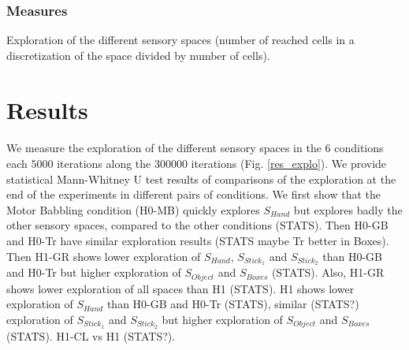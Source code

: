 \documentclass[10pt,letterpaper]{article}
\begin{document}
		
		\subsubsection{Measures}
			
			Exploration of the different sensory spaces (number of reached cells in a discretization of the space divided by number of cells).
			
		
	
%


\section{Results}
	
	\paragraph{}
	We measure the exploration of the different sensory spaces in the $6$ conditions each $5000$ iterations along the $300000$ iterations (Fig. \ref{res_explo}).
	We provide statistical Mann-Whitney U test results of comparisons of the exploration at the end of the experiments in different pairs of conditions.
	We first show that the Motor Babbling condition (H0-MB) quickly explores $S_{Hand}$ but explores badly the other sensory spaces, compared to the other conditions (STATS).
	Then H0-GB and H0-Tr have similar exploration results (STATS maybe Tr better in Boxes).
	Then H1-GR shows lower exploration of $S_{Hand}$, $S_{Stick_1}$ and $S_{Stick_2}$ than H0-GB and H0-Tr but higher exploration of $S_{Object}$ and $S_{Boxes}$ (STATS).
	Also, H1-GR shows lower exploration of all spaces than H1 (STATS).
	H1 shows lower exploration of $S_{Hand}$ than H0-GB and H0-Tr (STATS), similar (STATS?) exploration of $S_{Stick_1}$ and $S_{Stick_2}$ but higher exploration of $S_{Object}$ and $S_{Boxes}$ (STATS).
	H1-CL vs H1 (STATS?).
	
\end{document}
